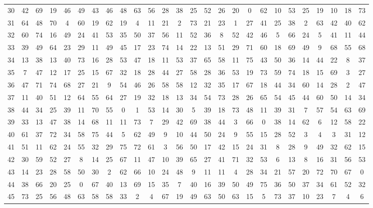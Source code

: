 \begin{table}
\begin{tabular}{c c c c c c c c c c c c c c c c c c c c c c c c c c }
30 & 42 & 69 & 19 & 46 & 49 & 43 & 46 & 48 & 63 & 56 & 28 & 38 & 25 & 52 & 26 & 20 & 0 & 62 & 10 & 53 & 25 & 19 & 10 & 18 & 73 \\
31 & 64 & 48 & 70 & 4 & 60 & 19 & 62 & 19 & 4 & 11 & 21 & 2 & 73 & 21 & 23 & 1 & 27 & 41 & 25 & 38 & 2 & 63 & 42 & 40 & 62 \\
32 & 60 & 74 & 16 & 49 & 24 & 41 & 53 & 35 & 50 & 37 & 56 & 11 & 52 & 36 & 8 & 52 & 42 & 46 & 5 & 66 & 24 & 5 & 41 & 11 & 44 \\
33 & 39 & 49 & 64 & 23 & 29 & 11 & 49 & 45 & 17 & 23 & 74 & 14 & 22 & 13 & 51 & 29 & 71 & 60 & 18 & 69 & 49 & 9 & 68 & 55 & 68 \\
34 & 13 & 38 & 13 & 40 & 73 & 16 & 28 & 53 & 47 & 18 & 11 & 53 & 37 & 65 & 58 & 11 & 75 & 43 & 50 & 36 & 14 & 44 & 22 & 8 & 37 \\
35 & 7 & 47 & 12 & 17 & 25 & 15 & 67 & 32 & 18 & 28 & 44 & 27 & 58 & 28 & 36 & 53 & 19 & 73 & 59 & 74 & 18 & 15 & 69 & 3 & 27 \\
36 & 47 & 71 & 74 & 68 & 27 & 21 & 9 & 54 & 46 & 26 & 58 & 58 & 12 & 32 & 35 & 17 & 67 & 18 & 44 & 34 & 60 & 14 & 28 & 2 & 47 \\
37 & 11 & 40 & 51 & 12 & 64 & 55 & 64 & 27 & 19 & 32 & 18 & 13 & 34 & 54 & 73 & 28 & 26 & 65 & 54 & 45 & 44 & 60 & 50 & 14 & 34 \\
38 & 44 & 34 & 25 & 39 & 11 & 70 & 55 & 0 & 1 & 53 & 14 & 30 & 5 & 39 & 18 & 73 & 48 & 11 & 39 & 31 & 7 & 57 & 54 & 63 & 69 \\
39 & 33 & 13 & 47 & 38 & 14 & 68 & 11 & 11 & 73 & 7 & 29 & 42 & 69 & 38 & 44 & 3 & 66 & 0 & 38 & 14 & 62 & 6 & 12 & 58 & 22 \\
40 & 61 & 37 & 72 & 34 & 58 & 75 & 44 & 5 & 62 & 49 & 9 & 10 & 44 & 50 & 24 & 9 & 55 & 15 & 28 & 52 & 3 & 4 & 3 & 31 & 12 \\
41 & 51 & 11 & 62 & 24 & 55 & 32 & 29 & 75 & 72 & 61 & 3 & 56 & 50 & 17 & 42 & 15 & 24 & 31 & 8 & 28 & 9 & 49 & 32 & 62 & 15 \\
42 & 30 & 59 & 52 & 27 & 8 & 14 & 25 & 67 & 11 & 47 & 10 & 39 & 65 & 27 & 41 & 71 & 32 & 53 & 6 & 13 & 8 & 16 & 31 & 56 & 53 \\
43 & 14 & 23 & 28 & 58 & 50 & 30 & 2 & 62 & 66 & 10 & 24 & 48 & 9 & 11 & 11 & 4 & 28 & 34 & 21 & 57 & 20 & 72 & 70 & 67 & 0 \\
44 & 38 & 66 & 20 & 25 & 0 & 67 & 40 & 13 & 69 & 15 & 35 & 7 & 40 & 16 & 39 & 50 & 49 & 75 & 36 & 50 & 37 & 34 & 61 & 52 & 32 \\
45 & 73 & 25 & 56 & 48 & 63 & 58 & 58 & 33 & 2 & 4 & 67 & 19 & 49 & 63 & 50 & 63 & 15 & 5 & 73 & 37 & 10 & 23 & 7 & 4 & 6 \\

\end{tabular}
\end{table}
